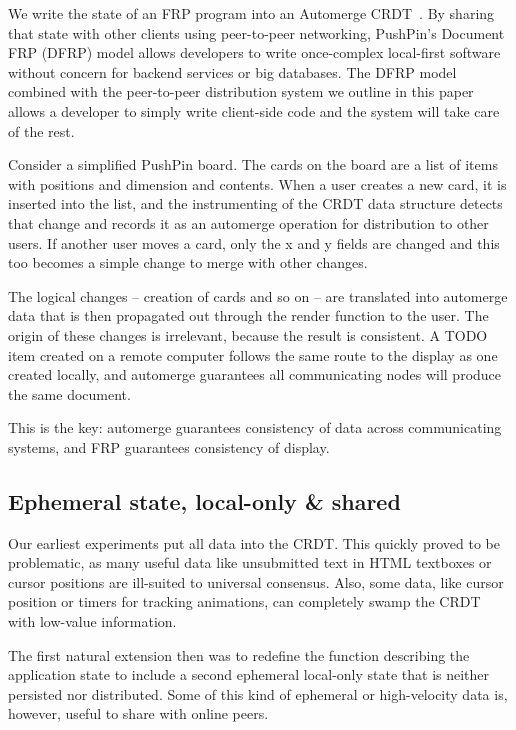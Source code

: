 \documentclass[sigplan,10pt]{acmart}
\begin{document}
We write the state of an FRP program into an Automerge CRDT~\cite{Automerge,Automerge:2018}. By sharing that state with other clients using peer-to-peer networking, PushPin's Document FRP (DFRP) model allows developers to write once-complex local-first software without concern for backend services or big databases. The DFRP model combined with the peer-to-peer distribution system we outline in this paper allows a developer to simply write client-side code and the system will take care of the rest.  

Consider a simplified PushPin board. The cards on the board are a list of items with positions and dimension and contents. When a user creates a new card, it is inserted into the list, and the instrumenting of the CRDT data structure detects that change and records it as an automerge operation for distribution to other users. If another user moves a card, only the x and y fields are changed and this too becomes a simple change to merge with other changes.


The logical changes -- creation of cards and so on -- are translated into automerge data that is then propagated out through the render function to the user. The origin of these changes is irrelevant, because the result is consistent. A TODO item created on a remote computer follows the same route to the display as one created locally, and automerge guarantees all communicating nodes will produce the same document.

This is the key: automerge guarantees consistency of data across communicating systems, and FRP guarantees consistency of display.

\subsection{Ephemeral state, local-only & shared}

Our earliest experiments put all data into the CRDT. This quickly proved to be problematic, as many useful data like unsubmitted text in HTML textboxes or cursor positions are ill-suited to universal consensus. Also, some data, like cursor position or timers for tracking animations, can completely swamp the CRDT with low-value information.

The first natural extension then was to redefine the function describing the application state to include a second ephemeral local-only state that is neither persisted nor distributed. Some of this kind of ephemeral or high-velocity data is, however, useful to share with online peers.
\end{document}
